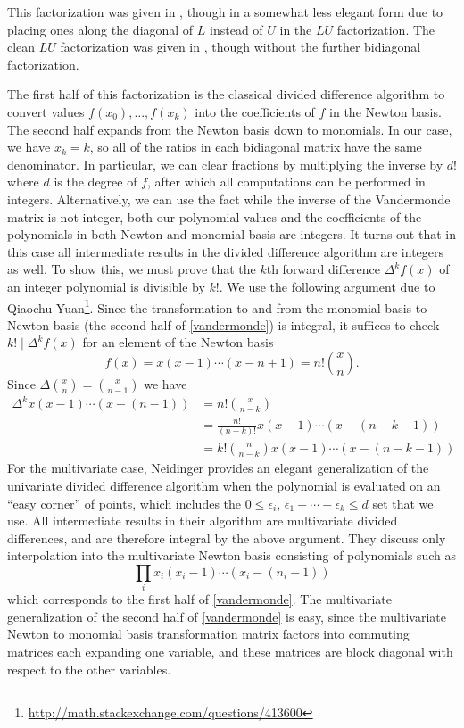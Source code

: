 \documentclass[11pt]{article}
\begin{document}
This factorization was given in \cite{oruc2000explicit}, though in a somewhat less elegant form due to placing ones along the diagonal of $L$ instead of $U$ in the $LU$ factorization.
The clean $LU$ factorization was given in \cite{olver2006multivariate}, though without the further bidiagonal factorization.

The first half of this factorization is the classical divided difference algorithm to convert values $f(x_0), \ldots, f(x_k)$ into the coefficients of $f$ in the Newton
basis.  The second half expands from the Newton basis down to monomials.  In our case, we have $x_k = k$, so all of the ratios in each bidiagonal matrix have the same denominator.
In particular, we can clear fractions by multiplying the inverse by $d!$ where $d$ is the degree of $f$, after which all computations can be performed in integers.  Alternatively,
we can use the fact while the inverse of the Vandermonde matrix is not integer, both our polynomial values and the coefficients of the polynomials in both Newton and monomial basis
are integers.  It turns out that in this case all intermediate results in the divided difference algorithm are integers as well.  To show this, we must prove that the $k$th forward
difference $\Delta^k f(x)$ of an integer polynomial is divisible by $k!$.  We use the following argument due to Qiaochu Yuan\footnote{\url{http://math.stackexchange.com/questions/413600}}.
Since the transformation to and from the monomial basis to Newton basis (the second half of \autoref{vandermonde}) is integral, it suffices to check $k! \mid \Delta^k f(x)$ for an
element of the Newton basis
$$f(x) = x(x-1)\cdots(x-n+1) = n!\binom{x}{n}.$$
Since $\Delta \binom{x}{n} = \binom{x}{n-1}$ we have
\begin{align*}
\Delta^k x(x-1)\cdots(x-(n-1))
  &= n! \binom{x}{n-k} \\
  &= \frac{n!}{(n-k)!} x(x-1)\cdots(x-(n-k-1)) \\
  &= k! \binom{n}{n-k} x(x-1)\cdots(x-(n-k-1))
\end{align*}
For the multivariate case, Neidinger \cite{neidinger2009multivariable} provides an elegant generalization of the univariate divided difference algorithm when the polynomial is
evaluated on an ``easy corner'' of points, which includes the $0 \le \epsilon_i$, $\epsilon_1 + \cdots + \epsilon_k \le d$ set that we use.  All intermediate results
in their algorithm are multivariate divided differences, and are therefore integral by the above argument.  They discuss only interpolation into the multivariate Newton basis
consisting of polynomials such as
$$\prod_i x_i(x_i-1)\cdots(x_i-(n_i-1))$$
which corresponds to the first half of \autoref{vandermonde}.  The multivariate generalization of the second half of \autoref{vandermonde} is easy, since the multivariate Newton to
monomial basis transformation matrix factors into commuting matrices each expanding one variable, and these matrices are block diagonal with respect to the other variables.
\end{document}
